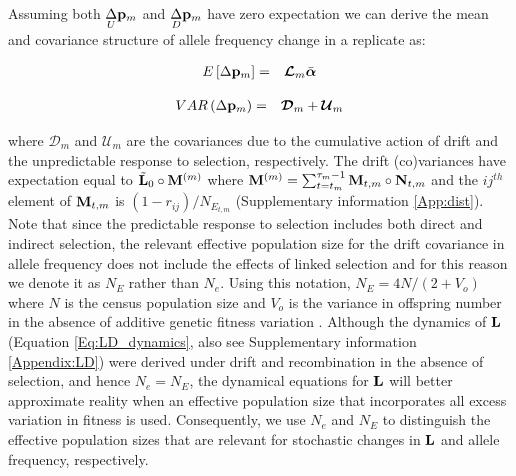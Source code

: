 \documentclass[12pt]{article}
\begin{document}
\begin{bibunit}
Assuming both $\underset{U}\Delta {\bf p}_{m}$ and $\underset{D}\Delta {\bf p}_{m}$ have zero expectation we can derive the mean and covariance structure of allele frequency change in a replicate as:

\begin{equation}
\begin{array}{rl}
E\left[\Delta {\bf p}_m\right]
=& \boldsymbol{\mathcal{L}}_m\bar{\boldsymbol{\alpha}}\\
\end{array}
\label{eq:Edelta}
\end{equation}


\begin{equation}
\begin{array}{rl}
VAR\left(\Delta {\bf p}_m\right) =&\boldsymbol{\mathcal{D}}_m+\boldsymbol{\mathcal{U}}_m\\
\end{array}
\end{equation}

where $\boldsymbol{\mathcal{D}}_m$ and $\boldsymbol{\mathcal{U}}_m$ are the covariances due to the cumulative action of drift and the unpredictable response to selection, respectively. The drift (co)variances have expectation equal to $\tilde{\bf L}_{0}\circ{\bf M}^{(m)}$ where ${\bf M}^{(m)}=\sum_{t=t_m}^{\tau_m-1}{\bf M}_{t,m}\circ{\bf N}_{t,m}$ and the $ij^{th}$ element of ${\bf M}_{t,m}$ is $(1-r_{ij})/N_{E_{t,m}}$ (Supplementary information \ref{App:dist}). Note that since the predictable response to selection includes both direct and indirect selection, the relevant effective population size for the drift covariance in allele frequency does not include the effects of linked selection and for this reason we denote it as $N_E$ rather than $N_e$. Using this notation, $N_E=4N/(2+V_o)$ where $N$ is the census population size and $V_o$ is the variance in offspring number in the absence of additive genetic fitness variation \citep{Wright.1938}. Although the dynamics of ${\bf L}$ (Equation \ref{Eq:LD_dynamics}, also see Supplementary information \ref{Appendix:LD}) were derived under drift and recombination in the absence of selection, and hence $N_e=N_E$, the dynamical equations for ${\bf L}$ will better approximate reality when an effective population size that incorporates all excess variation in fitness is used. Consequently, we use $N_e$ and $N_E$ to distinguish the effective population sizes that are relevant for stochastic changes in ${\bf L}$ and allele frequency, respectively.


\end{bibunit}
\end{document}
